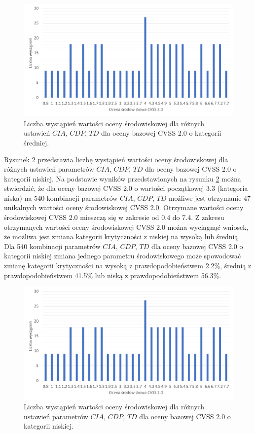 \begin{figure}[!ht]
\centering
\includegraphics[width=.9\textwidth]{Chapters/Wplyw/cvss2/cvss_2_medium.pdf}
\caption{Liczba wystąpień wartości oceny środowiskowej dla różnych ustawień $CIA$, $CDP$, $TD$ dla oceny bazowej CVSS 2.0 o kategorii średniej.}
\label{fig:wplyw:env_a:cvss_2_medium}
\end{figure}

\bigbreak
Rysunek \ref{fig:wplyw:env_a:cvss_2_low} przedstawia liczbę wystąpień wartości oceny środowiskowej dla różnych ustawień parametrów $CIA$, $CDP$, $TD$ dla oceny bazowej CVSS 2.0 o kategorii niskiej. Na podstawie wyników przedstawionych na rysunku \ref{fig:wplyw:env_a:cvss_2_low} można stwierdzić, że dla oceny bazowej CVSS 2.0 o wartości początkowej 3.3 (kategoria niska) na 540 kombinacji parametrów $CIA$, $CDP$, $TD$ możliwe jest otrzymanie 47 unikalnych wartości oceny środowiskowej CVSS 2.0. Otrzymane wartości oceny środowiskowej CVSS 2.0 mieszczą się w zakresie od 0.4 do 7.4. Z zakresu otrzymanych wartości oceny środowiskowej CVSS 2.0 można wyciągnąć wniosek, że możliwa jest zmiana kategorii krytyczności z niskiej na wysoką lub średnią. Dla 540 kombinacji parametrów $CIA$, $CDP$, $TD$ dla oceny bazowej CVSS 2.0 o kategorii niskiej zmiana jednego parametru środowiskowego może spowodować zmianę kategorii krytyczności na wysoką z prawdopodobieństwem 2.2\%, średnią z prawdopodobieństwem 41.5\% lub niską z prawdopodobieństwem 56.3\%.

\begin{figure}[!ht]
\centering
\includegraphics[width=.9\textwidth]{Chapters/Wplyw/cvss2/cvss_2_low.pdf}
\caption{Liczba wystąpień wartości oceny środowiskowej dla różnych ustawień parametrów $CIA$, $CDP$, $TD$ dla oceny bazowej CVSS 2.0 o kategorii niskiej.}
\label{fig:wplyw:env_a:cvss_2_low}
\end{figure}

